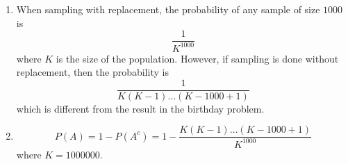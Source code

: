 \begin{enumerate}[label=(\alph*)]
\item  When sampling with replacement, the probability of any sample of size 
$1000$ is $$\frac{1}{K^{1000}}$$ where $K$ is the size of the population. 
However, if sampling is done without replacement, then the probability is 
$$\frac{1}{K(K-1) \dots (K-1000+1)}$$ which is different from the result in 
the birthday problem.

\item $$P(A) = 1 - P(A^{c}) = 1 - \frac{K(K-1) \dots (K-1000+1)}{K^{1000}}$$ 
where $K = 1000000$.
\end{enumerate}